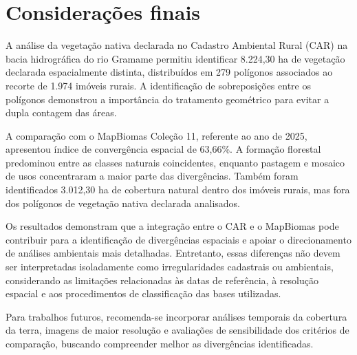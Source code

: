 
\section{Considerações finais}

A análise da vegetação nativa declarada no Cadastro Ambiental Rural (CAR) na bacia hidrográfica do rio Gramame permitiu identificar 8.224,30 ha de vegetação declarada espacialmente distinta, distribuídos em 279 polígonos associados ao recorte de 1.974 imóveis rurais. A identificação de sobreposições entre os polígonos demonstrou a importância do tratamento geométrico para evitar a dupla contagem das áreas.

A comparação com o MapBiomas Coleção 11, referente ao ano de 2025, apresentou índice de convergência espacial de 63,66\%. A formação florestal predominou entre as classes naturais coincidentes, enquanto pastagem e mosaico de usos concentraram a maior parte das divergências. Também foram identificados 3.012,30 ha de cobertura natural dentro dos imóveis rurais, mas fora dos polígonos de vegetação nativa declarada analisados.

Os resultados demonstram que a integração entre o CAR e o MapBiomas pode contribuir para a identificação de divergências espaciais e apoiar o direcionamento de análises ambientais mais detalhadas. Entretanto, essas diferenças não devem ser interpretadas isoladamente como irregularidades cadastrais ou ambientais, considerando as limitações relacionadas às datas de referência, à resolução espacial e aos procedimentos de classificação das bases utilizadas.

Para trabalhos futuros, recomenda-se incorporar análises temporais da cobertura da terra, imagens de maior resolução e avaliações de sensibilidade dos critérios de comparação, buscando compreender melhor as divergências identificadas.


\label{pag:fim-texto}
\newpage
